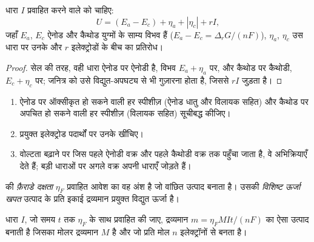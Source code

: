 \begin{proposition}[विद्युत-अपघटक की वोल्टता]\label{prop:b2:batteries-electrolysis:electrolysis-voltage}
धारा $I$ प्रवाहित करने वाले  को चाहिए:
\[
  U = (E_a - E_c) + \eta_a + |\eta_c| + rI ,
\]
जहाँ $E_a$, $E_c$ ऐनोड और कैथोड युग्मों के साम्य विभव हैं
($E_a - E_c = \Delta_r G/(nF)$), $\eta_a$, $\eta_c$ उस धारा पर उनके 
और $r$ इलेक्ट्रोडों के बीच का प्रतिरोध।
\end{proposition}

\begin{proof}
सेल की तरह, वही धारा ऐनोड पर ऐनोडी है, विभव $E_a +
\eta_a$ पर, और कैथोड पर कैथोडी, $E_c + \eta_c$ पर; जनित्र को उसे
विद्युत-अपघट्य से भी गुज़ारना होता है, जिससे $rI$ जुड़ता है।
\end{proof}

\begin{method}[विद्युत-अपघटन का पूर्वानुमान]\label{met:b2:batteries-electrolysis:predict-electrolysis}
\begin{enumerate}
  \item ऐनोड पर ऑक्सीकृत हो सकने वाली हर स्पीशीज़ (ऐनोड धातु और
        विलायक सहित) और कैथोड पर अपचित हो सकने वाली हर स्पीशीज़ (विलायक सहित)
        सूचीबद्ध कीजिए।
  \item प्रयुक्त इलेक्ट्रोड पदार्थों पर उनके  खींचिए।
  \item वोल्टता बढ़ाने पर जिस पहले ऐनोडी वक्र और पहले कैथोडी
        वक्र तक पहुँचा जाता है, वे अभिक्रियाएँ देते हैं; बड़ी धाराओं पर अगले वक्र
        अपनी धाराएँ जोड़ते हैं।
\end{enumerate}
\end{method}

\begin{definition}[फ़ैराडे दक्षता]\label{def:b2:batteries-electrolysis:faradaic-efficiency}
 की \emph{फ़ैराडे दक्षता} $\eta_F$ प्रवाहित आवेश का
वह अंश है जो वांछित उत्पाद बनाता है। उसकी \emph{विशिष्ट ऊर्जा खपत}
उत्पाद के प्रति इकाई द्रव्यमान प्रयुक्त विद्युत ऊर्जा है।
\end{definition}

\begin{proposition}[फ़ैराडे का नियम]\label{prop:b2:batteries-electrolysis:faraday-mass}
धारा $I$, जो समय $t$ तक  $\eta_F$ के साथ प्रवाहित की जाए,
द्रव्यमान $m = \eta_F MIt/(nF)$ का ऐसा उत्पाद बनाती है जिसका मोलर द्रव्यमान $M$
है और जो प्रति मोल $n$ इलेक्ट्रॉनों से बनता है।
\end{proposition}

